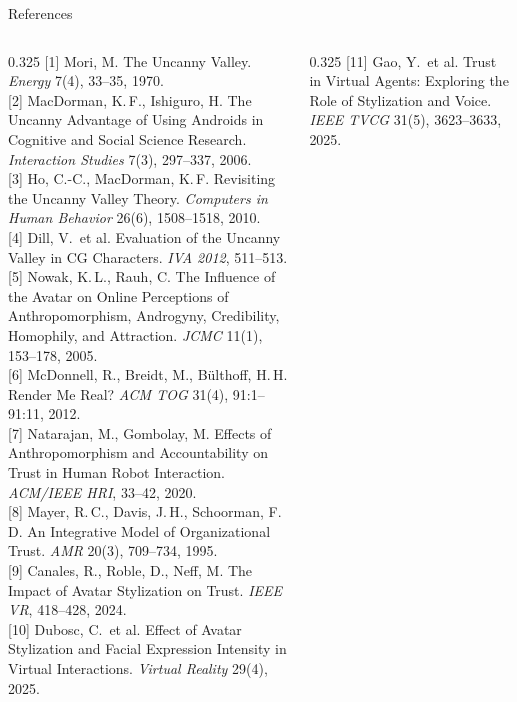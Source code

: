 \documentclass[aspectratio=169,10pt]{beamer}
\begin{document}
\begin{frame}{References}
  \vspace{0.2em}
  \tiny
  \begin{columns}[T]
    \begin{column}{0.325\textwidth}
      [1] Mori, M. The Uncanny Valley. \textit{Energy} 7(4), 33--35, 1970.\\[0.3em]
      [2] MacDorman, K.\,F., Ishiguro, H. The Uncanny Advantage of Using Androids in Cognitive and Social Science Research. \textit{Interaction Studies} 7(3), 297--337, 2006.\\[0.3em]
      [3] Ho, C.-C., MacDorman, K.\,F. Revisiting the Uncanny Valley Theory. \textit{Computers in Human Behavior} 26(6), 1508--1518, 2010.\\[0.3em]
      [4] Dill, V.\ et al. Evaluation of the Uncanny Valley in CG Characters. \textit{IVA 2012}, 511--513.\\[0.3em]
      [5] Nowak, K.\,L., Rauh, C. The Influence of the Avatar on Online Perceptions of Anthropomorphism, Androgyny, Credibility, Homophily, and Attraction. \textit{JCMC} 11(1), 153--178, 2005.\\[0.3em]
      [6] McDonnell, R., Breidt, M., B\"ulthoff, H.\,H. Render Me Real? \textit{ACM TOG} 31(4), 91:1--91:11, 2012.\\[0.3em]
      [7] Natarajan, M., Gombolay, M. Effects of Anthropomorphism and Accountability on Trust in Human Robot Interaction. \textit{ACM/IEEE HRI}, 33--42, 2020.\\[0.3em]
      [8] Mayer, R.\,C., Davis, J.\,H., Schoorman, F.\,D. An Integrative Model of Organizational Trust. \textit{AMR} 20(3), 709--734, 1995.\\[0.3em]
      [9] Canales, R., Roble, D., Neff, M. The Impact of Avatar Stylization on Trust. \textit{IEEE VR}, 418--428, 2024.\\[0.3em]
      [10] Dubosc, C.\ et al. Effect of Avatar Stylization and Facial Expression Intensity in Virtual Interactions. \textit{Virtual Reality} 29(4), 2025.\\[0.3em]
    \end{column}
    \begin{column}{0.325\textwidth}
      [11] Gao, Y.\ et al. Trust in Virtual Agents: Exploring the Role of Stylization and Voice. \textit{IEEE TVCG} 31(5), 3623--3633, 2025.\\[0.3em]

\end{column}
\end{columns}
\end{frame}
\end{document}
